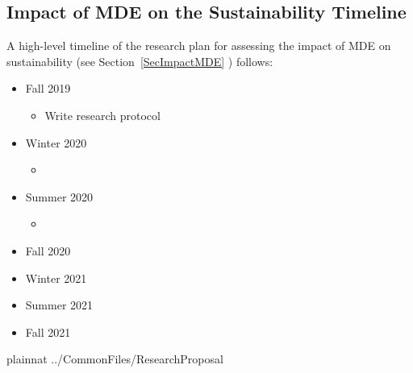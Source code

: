 \documentclass[12pt]{article}
\begin{document}
\subsection{Impact of MDE on the Sustainability Timeline}

A high-level timeline of the research plan for assessing the impact of MDE on
sustainability (see Section~\ref{SecImpactMDE} ) follows:

\begin{itemize}
\item Fall 2019
  \begin{itemize}
  \item Write research protocol
  \end{itemize}
\item Winter 2020
  \begin{itemize}
  \item 
  \end{itemize}
\item Summer 2020
  \begin{itemize}
  \item 
  \end{itemize}
\item Fall 2020
\item Winter 2021
\item Summer 2021
\item Fall 2021
\end{itemize}

\newpage

 {plainnat}
 {../CommonFiles/ResearchProposal}
\end{document}
